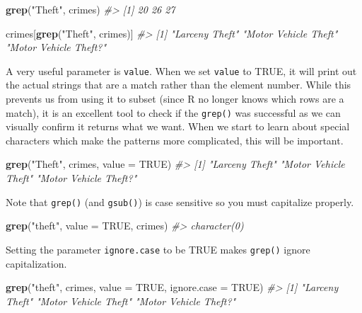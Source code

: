 \documentclass[
  12pt,
]{book}
\newenvironment{Shaded}{\begin{snugshade}}{\end{snugshade}}
\newcommand{\CommentTok}[1]{\textcolor[rgb]{0.56,0.35,0.01}{\textit{#1}}}
\newcommand{\DataTypeTok}[1]{\textcolor[rgb]{0.13,0.29,0.53}{#1}}
\newcommand{\KeywordTok}[1]{\textcolor[rgb]{0.13,0.29,0.53}{\textbf{#1}}}
\newcommand{\NormalTok}[1]{#1}
\newcommand{\OtherTok}[1]{\textcolor[rgb]{0.56,0.35,0.01}{#1}}
\newcommand{\StringTok}[1]{\textcolor[rgb]{0.31,0.60,0.02}{#1}}
\begin{document}
\begin{Shaded}
\begin{Highlighting}[]
\KeywordTok{grep}\NormalTok{(}\StringTok{"Theft"}\NormalTok{, crimes)}
\CommentTok{\#> [1] 20 26 27}
\end{Highlighting}
\end{Shaded}

\begin{Shaded}
\begin{Highlighting}[]
\NormalTok{crimes[}\KeywordTok{grep}\NormalTok{(}\StringTok{"Theft"}\NormalTok{, crimes)]}
\CommentTok{\#> [1] "Larceny Theft"        "Motor Vehicle Theft"  "Motor Vehicle Theft?"}
\end{Highlighting}
\end{Shaded}

A very useful parameter is \texttt{value}. When we set \texttt{value} to TRUE, it will print out the actual strings that are a match rather than the element number. While this prevents us from using it to subset (since R no longer knows which rows are a match), it is an excellent tool to check if the \texttt{grep()} was successful as we can visually confirm it returns what we want. When we start to learn about special characters which make the patterns more complicated, this will be important.

\begin{Shaded}
\begin{Highlighting}[]
\KeywordTok{grep}\NormalTok{(}\StringTok{"Theft"}\NormalTok{, crimes, }\DataTypeTok{value =} \OtherTok{TRUE}\NormalTok{)}
\CommentTok{\#> [1] "Larceny Theft"        "Motor Vehicle Theft"  "Motor Vehicle Theft?"}
\end{Highlighting}
\end{Shaded}

Note that \texttt{grep()} (and \texttt{gsub()}) is case sensitive so you must capitalize properly.

\begin{Shaded}
\begin{Highlighting}[]
\KeywordTok{grep}\NormalTok{(}\StringTok{"theft"}\NormalTok{, }\DataTypeTok{value =} \OtherTok{TRUE}\NormalTok{, crimes)}
\CommentTok{\#> character(0)}
\end{Highlighting}
\end{Shaded}

Setting the parameter \texttt{ignore.case} to be TRUE makes \texttt{grep()} ignore capitalization.

\begin{Shaded}
\begin{Highlighting}[]
\KeywordTok{grep}\NormalTok{(}\StringTok{"theft"}\NormalTok{, crimes, }\DataTypeTok{value =} \OtherTok{TRUE}\NormalTok{, }\DataTypeTok{ignore.case =} \OtherTok{TRUE}\NormalTok{)}
\CommentTok{\#> [1] "Larceny Theft"        "Motor Vehicle Theft"  "Motor Vehicle Theft?"}
\end{Highlighting}
\end{Shaded}
\end{document}
